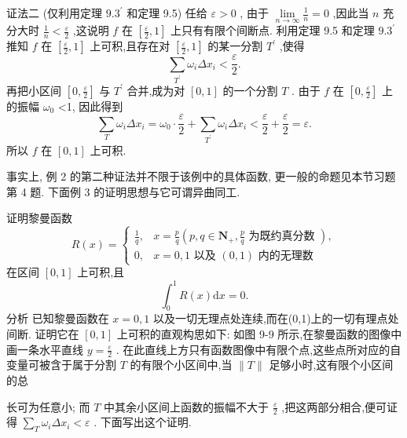 证法二 (仅利用定理 \({9.3}^{\prime }\) 和定理 9.5) 任给 \(\varepsilon  > 0\) , 由于 \(\mathop{\lim }\limits_{{n \rightarrow  \infty }}\frac{1}{n} = 0\) ,因此当 \(n\) 充分大时 \(\frac{1}{n} < \frac{\varepsilon }{2}\) ,这说明 \(f\) 在 \(\left\lbrack  {\frac{\varepsilon }{2},1}\right\rbrack\) 上只有有限个间断点. 利用定理 9.5 和定理 \({9.3}^{\prime }\) 推知 \(f\) 在 \(\left\lbrack  {\frac{\varepsilon }{2},1}\right\rbrack\) 上可积,且存在对 \(\left\lbrack  {\frac{\varepsilon }{2},1}\right\rbrack\) 的某一分割 \({T}^{\prime }\) ,使得
\[
\mathop{\sum }\limits_{{T}^{\prime }}{\omega }_{i}\Delta {x}_{i} < \frac{\varepsilon }{2}.
\]
再把小区间 \(\left\lbrack  {0,\frac{\varepsilon }{2}}\right\rbrack\) 与 \({T}^{\prime }\) 合并,成为对 \(\left\lbrack  {0,1}\right\rbrack\) 的一个分割 \(T\) . 由于 \(f\) 在 \(\left\lbrack  {0,\frac{\varepsilon }{2}}\right\rbrack\) 上的振幅 \({\omega }_{0}\) <1, 因此得到
\[
\mathop{\sum }\limits_{T}{\omega }_{i}\Delta {x}_{i} = {\omega }_{0} \cdot  \frac{\varepsilon }{2} + \mathop{\sum }\limits_{{T}^{\prime }}{\omega }_{i}\Delta {x}_{i} < \frac{\varepsilon }{2} + \frac{\varepsilon }{2} = \varepsilon .
\]
所以 \(f\) 在 \(\left\lbrack  {0,1}\right\rbrack\) 上可积.

事实上, 例 2 的第二种证法并不限于该例中的具体函数, 更一般的命题见本节习题第 4 题. 下面例 3 的证明思想与它可谓异曲同工.

\begin{example}

\end{example}
证明黎曼函数
\[
R\left( x\right)  = \left\{  \begin{array}{ll} \frac{1}{q}, & x = \frac{p}{q}\left( {p,q \in  {\mathbf{N}}_{ + },\frac{p}{q}\text{ 为既约真分数 }}\right) , \\  0, & x = 0,1\text{ 以及 }\left( {0,1}\right) \text{ 内的无理数 } \end{array}\right.
\]
在区间 \(\left\lbrack  {0,1}\right\rbrack\) 上可积,且
\[
{\int }_{0}^{1}R\left( x\right) \mathrm{d}x = 0.
\]
分析 已知黎曼函数在 \(x = 0,1\) 以及一切无理点处连续,而在(0,1)上的一切有理点处间断. 证明它在 \(\left\lbrack  {0,1}\right\rbrack\) 上可积的直观构思如下: 如图 9-9 所示,在黎曼函数的图像中画一条水平直线 \(y = \frac{\varepsilon }{2}\) . 在此直线上方只有函数图像中有限个点,这些点所对应的自变量可被含于属于分割 \(T\) 的有限个小区间中,当 \(\parallel T\parallel\) 足够小时,这有限个小区间的总

长可为任意小; 而 \(T\) 中其余小区间上函数的振幅不大于 \(\frac{\varepsilon }{2}\) ,把这两部分相合,便可证得 \(\mathop{\sum }\limits_{T}{\omega }_{i}\Delta {x}_{i} < \varepsilon\) . 下面写出这个证明.

